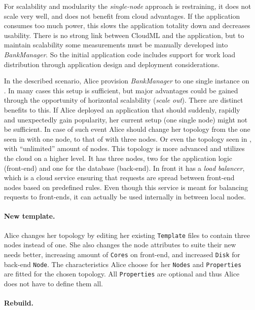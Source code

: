 For scalability and modularity the \emph{single-node} approach is restraining,
\ie it does not scale very well, and does not benefit from cloud advantages.
If the application consumes too much  power, 
this slows the application totality down and decreases usability.
There is no strong link between CloudML and the application, but to maintain
scalability some measurements must be manually developed into \emph{BankManager}.
So the initial application code includes support for work load distribution through 
application design and deployment considerations.

In the described scenario, Alice provision \emph{BankManager} to one single instance on .
In many cases this setup is sufficient, but major advantages
could be gained through the opportunity of horizontal scalability (\emph{scale out}).
There are distinct benefits to this.
If Alice deployed an application that should suddenly, 
rapidly and unexpectedly gain popularity, her current setup (one single node) might not be sufficient.
In case of such event Alice should change her topology from the one seen in 
 with one node, to that of  with three nodes.
Or even the topology seen in , with ``unlimited'' amount of nodes.
This topology is more advanced and utilizes the cloud on a higher level.
It has three nodes, two for the application logic (front-end) and one for the database (back-end).
In front it has a \emph{load balancer}, which is a cloud service ensuring that requests
are spread between front-end nodes based on predefined rules.
Even though this service is meant for balancing requests to front-ends,
it can actually be used internally in between local nodes.

\paragraph{New template.}

Alice changes her topology by editing her existing \texttt{Template} files 
to contain three nodes instead of one. 
She also changes the node attributes to suite their new needs better,
\ie increasing amount of \texttt{Cores} on front-end, and increased \texttt{Disk} for back-end \texttt{Node}.
The characteristics Alice choose for her \texttt{Nodes} and \texttt{Properties} are fitted
for the chosen topology.
All \texttt{Properties} are optional and thus Alice does not have to define them all.

\paragraph{Rebuild.}

